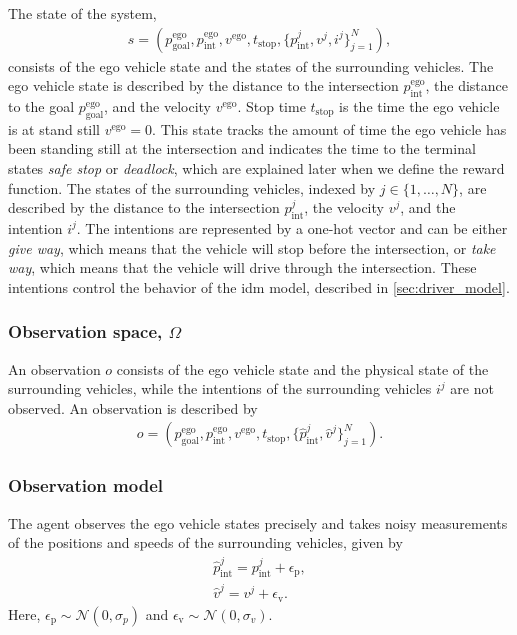 The state of the system,
\begin{align}
    s = (p^\mathrm{ego}_\mathrm{goal},p^\mathrm{ego}_\mathrm{int}, v^\mathrm{ego}, t_\mathrm{stop}, \{p^{j}_\mathrm{int}, v^j, i^j\}_{j=1}^N),
    \label{eq:state}
\end{align}
consists of the ego vehicle state and the states of the surrounding vehicles. The ego vehicle state is described by the distance to the intersection $p^\mathrm{ego}_\mathrm{int}$, the distance to the goal $p^\mathrm{ego}_\mathrm{goal}$, and the velocity $v^\mathrm{ego}$. Stop time $t_\mathrm{stop}$ is the time the ego vehicle is at stand still $v^\mathrm{ego}=0$. This state tracks the amount of time the ego vehicle has been standing still at the intersection and indicates the time to the terminal states \textit{safe stop} or \textit{deadlock}, which are explained later when we define the reward function. The states of the surrounding vehicles, indexed by $j \in \{1, \ldots, N\}$, are described by the distance to the intersection $p^{j}_\mathrm{int}$, the velocity $v^j$, and the intention $i^j$. The intentions are represented by a one-hot vector and can be either \textit{give way}, which means that the vehicle will stop before the intersection, or \textit{take way}, which means that the vehicle will drive through the intersection. These intentions control the behavior of the \gls{idm} model, described in \ref{sec:driver_model}.

\subsubsection{Observation space, $\Omega$}
An observation $o$ consists of the ego vehicle state and the physical state of the surrounding vehicles, while the intentions of the surrounding vehicles $i^j$ are not observed. An observation is described by
\begin{align}
    o = (p^\mathrm{ego}_\mathrm{goal},p^\mathrm{ego}_\mathrm{int}, v^\mathrm{ego}, t_\mathrm{stop}, \{\hat{p}^{j}_\mathrm{int}, \hat{v}^j\}_{j=1}^N).
\end{align}

\subsubsection{Observation model}

The agent observes the ego vehicle states precisely and takes noisy measurements of the positions and speeds of the surrounding vehicles, given by
%
\begin{align}
    \label{eq:noise_pos}
    \hat{p}^{j}_\mathrm{int} = p^{j}_\mathrm{int} + \epsilon_\mathrm{p},\\ 
    \hat{v}^j = v^j + \epsilon_\mathrm{v}.
    \label{eq:noise_vel}
\end{align}
%
Here, $\epsilon_\mathrm{p} \sim \mathcal{N}(0, \sigma_p)$ and $\epsilon_\mathrm{v} \sim \mathcal{N}(0, \sigma_v)$.



